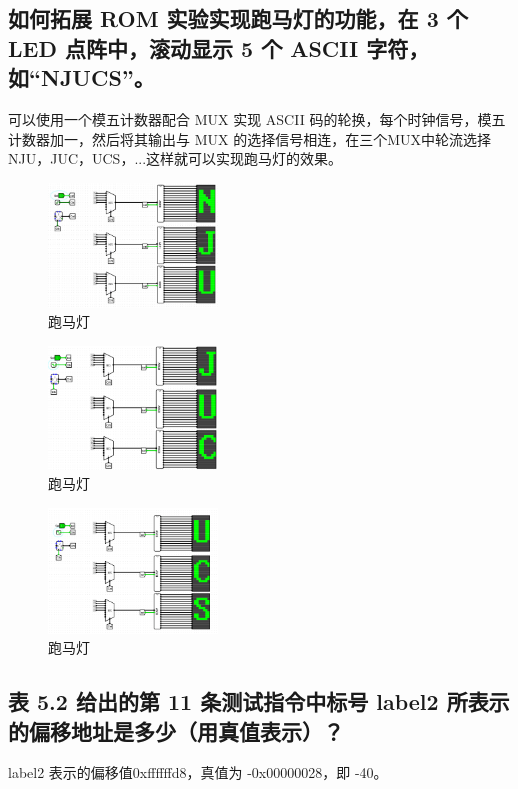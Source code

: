 \documentclass{article}
\begin{document}
    \subsection{如何拓展 ROM 实验实现跑马灯的功能，在 3 个 LED 点阵中，滚动显示 5 个 ASCII 字符，如“NJUCS”。}
    可以使用一个模五计数器配合 MUX 实现 ASCII 码的轮换，每个时钟信号，模五计数器加一，然后将其输出与 MUX 的选择信号相连，在三个MUX中轮流选择NJU，JUC，UCS，...这样就可以实现跑马灯的效果。
    \begin{figure}[H]
        \centering
        \includegraphics[width=0.4\textwidth]{8.1.png}
        \caption{跑马灯}
    \end{figure}
    \begin{figure}[H]
        \centering
        \includegraphics[width=0.4\textwidth]{8.2.png}
        \caption{跑马灯}
    \end{figure}
    \begin{figure}[H]
        \centering
        \includegraphics[width=0.4\textwidth]{8.3.png}
        \caption{跑马灯}
    \end{figure}

    \subsection{表 5.2 给出的第 11 条测试指令中标号 label2 所表示的偏移地址是多少（用真值表示）？}
    label2 表示的偏移值0xffffffd8，真值为 -0x00000028，即 -40。
\end{document}
